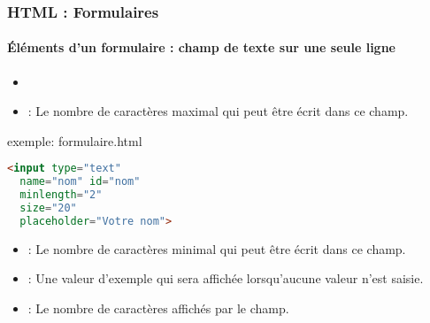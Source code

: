 \documentclass[xcolor=table]{beamer}
\begin{document}
\begin{frame}[fragile]
\frametitle{HTML : Formulaires}
\framesubtitle{Éléments d'un formulaire : champ de texte sur une seule ligne}

\begin{minipage}{0.59\textwidth} 
	\begin{itemize}
		\item {}
		\item {} : Le nombre de caractères maximal qui peut être écrit dans ce champ.
	\end{itemize}
\end{minipage}
%
\begin{minipage}{0.4\textwidth}
\begin{exampleblock}{exemple: formulaire.html}
\lstset{escapeinside=**}
\scriptsize\bfseries\vspace{-6pt}
\begin{lstlisting}[language={html}]
<input type="text" 
  name="nom" id="nom"
  minlength="2" 
  size="20"
  placeholder="Votre nom">
\end{lstlisting}\vspace{-6pt}
\end{exampleblock}
\end{minipage}

\begin{itemize}
	\item {} : Le nombre de caractères minimal qui peut être écrit dans ce champ.
	\item {} : Une valeur d'exemple qui sera affichée lorsqu'aucune valeur n'est saisie.
	\item {} : Le nombre de caractères affichés par le champ.
\end{itemize}

\end{frame}
\end{document}
